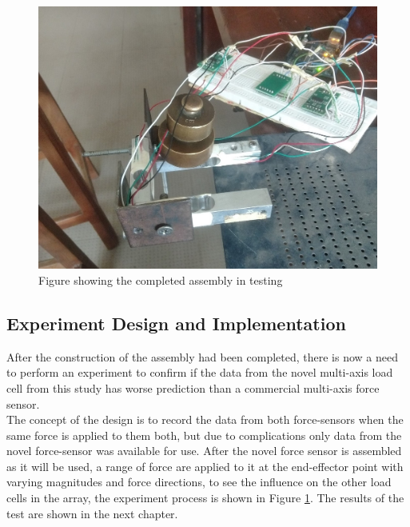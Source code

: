\begin{figure}[p]%
	\centering
	\includegraphics[width=\linewidth]{figures/ch3/loadcelltesting}
	\caption{Figure showing the completed assembly in testing}
	\label{fig:loadcelltest}
\end{figure}
\newpage
\subsection{Experiment Design and Implementation}\label{sec:experiment}
After the construction of the assembly had been completed, there is now a need to perform an experiment to confirm if the data from the novel multi-axis load cell from this study has worse prediction than a commercial multi-axis force sensor.\\
The concept of the design is to record the data from both force-sensors when the same force is applied to them both, but due to complications only data from the novel force-sensor was available for use. After the novel force sensor is assembled as it will be used, a range of force are applied to it at the end-effector point with varying magnitudes and force directions, to see the influence on the other load cells in the array, the experiment process is shown in Figure \ref{fig:loadcelltest}. The results of the test are shown in the next chapter.
